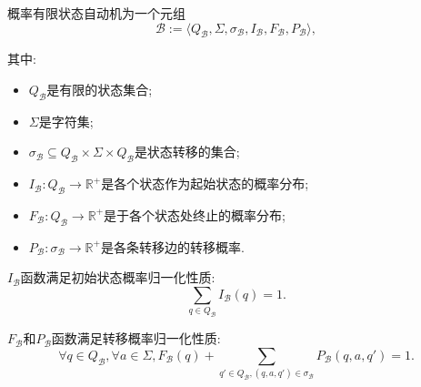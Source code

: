         \begin{definition}
            \label{def.pfsa}
            概率有限状态自动机为一个元组
            \begin{equation}
                \mathcal{B} := \langle Q_{\mathcal{B}}, \Sigma, \sigma_{\mathcal{B}}, I_{\mathcal{B}}, F_{\mathcal{B}}, P_{\mathcal{B}} \rangle,
            \end{equation}
            
            其中:
            \begin{itemize}
                \item $Q_{\mathcal{B}}$是有限的状态集合;
                
                \item $\Sigma$是字符集;
                
                \item $\sigma_{\mathcal{B}} \subseteq Q_{\mathcal{B}} \times \Sigma \times Q_{\mathcal{B}}$是状态转移的集合;
                
                \item $I_{\mathcal{B}} : Q_{\mathcal{B}} \to \mathbb{R}^{+}$是各个状态作为起始状态的概率分布;
                
                \item $F_{\mathcal{B}}: Q_{\mathcal{B}} \to \mathbb{R}^{+}$是于各个状态处终止的概率分布;
                
                \item $P_{\mathcal{B}} : \sigma_{\mathcal{B}} \to \mathbb{R}^{+}$是各条转移边的转移概率.
            \end{itemize}
            
            $I_{\mathcal{B}}$函数满足初始状态概率归一化性质:
            \begin{equation}
                \label{eq:pfsa_init_normal}
                \sum_{q \in Q_{\mathcal{B}}} I_{\mathcal{B}}(q) = 1.
            \end{equation}
            
            $F_{\mathcal{B}}$和$P_{\mathcal{B}}$函数满足转移概率归一化性质:
            \begin{equation}
                \label{eq:pfsa_trans_normal}
                \forall q \in Q_{\mathcal{B}}, \forall a \in \Sigma, F_{\mathcal{B}}(q) + \sum_{q' \in Q_{\mathcal{B}}, (q,a,q') \in \sigma_{\mathcal{B}}} P_{\mathcal{B}}(q,a,q') = 1.
            \end{equation}
        \end{definition}
        
